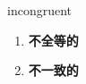 
\begin{frame}
{\huge incongruent}
\begin{center}
\begin{enumerate}\Large
  \item \textbf{不全等的}
  \item \textbf{不一致的}
\end{enumerate}
\end{center}
\end{frame}
